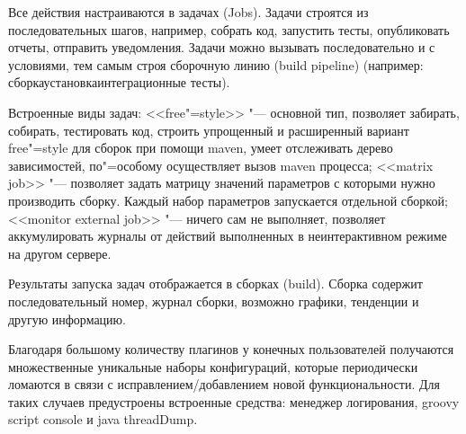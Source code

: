 \documentclass[10pt, a5paper]{article}
\begin{document}
Все действия настраиваются в задачах (Jobs). Задачи строятся из последовательных шагов, например, собрать код, запустить тесты, опубликовать отчеты, отправить уведомления. Задачи можно вызывать последовательно и с условиями, тем самым строя сборочную линию (build pipeline) (например: сборка\rightarrow{}установка\rightarrow{}интеграционные тесты).

Встроенные виды задач:  <<free"=style>> "--- основной тип, позволяет забирать, собирать, тестировать код, строить упрощенный и расширенный вариант free"=style для сборок при помощи maven, умеет отслеживать дерево зависимостей, по"=особому осуществляет вызов maven процесса; <<matrix job>>  "--- позволяет задать матрицу значений параметров с которыми нужно производить сборку. Каждый набор параметров запускается отдельной сборкой; <<monitor external job>> "--- ничего сам не выполняет, позволяет аккумулировать журналы от действий выполненных  в неинтерактивном режиме на другом сервере.

Результаты запуска задач отображается в сборках (build). Сборка содержит последовательный номер, журнал сборки, возможно графики, тенденции и другую информацию.

Благодаря большому количеству плагинов у конечных пользователей получаются множественные уникальные наборы конфигураций, которые периодически ломаются в связи с исправлением/добавлением новой функциональности. Для таких случаев предустроены встроенные средства: менеджер логирования, groovy script console и java threadDump.
\end{document}
